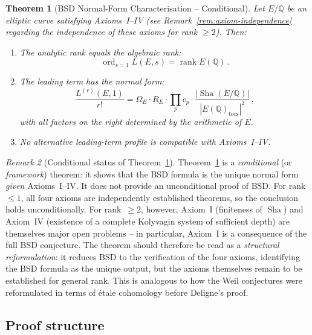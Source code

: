 \documentclass[aps,prd,twocolumn,superscriptaddress,nofootinbib]{revtex4-2}
\newtheorem{theorem}{Theorem}[section]
\theoremstyle{definition}
\theoremstyle{remark}
\newtheorem{remark}[theorem]{Remark}
\DeclareMathOperator{\ord}{ord}
\DeclareMathOperator{\rank}{rank}
\DeclareMathOperator{\Sha}{Sha}
\begin{document}
\begin{theorem}[BSD Normal-Form Characterisation -- Conditional]
\label{thm:bsd_normal}
Let $E/\mathbb{Q}$ be an elliptic curve satisfying Axioms~I--IV (see Remark~\ref{rem:axiom-independence} regarding the independence of these axioms for rank $\geq 2$). Then:
\begin{enumerate}
\item The analytic rank equals the algebraic rank:
\begin{equation}
\ord_{s=1} L(E,s) = \rank E(\mathbb{Q})\,.
\end{equation}
\item The leading term has the normal form:
\begin{equation}
\frac{L^{(r)}(E,1)}{r!} = \Omega_E \cdot R_E \cdot \prod_p c_p \cdot \frac{|\Sha(E/\mathbb{Q})|}{|E(\mathbb{Q})_{\mathrm{tors}}|^2}\,,
\end{equation}
with all factors on the right determined by the arithmetic of $E$.
\item No alternative leading-term profile is compatible with Axioms~I--IV.
\end{enumerate}
\end{theorem}

\begin{remark}[Conditional status of Theorem~\ref{thm:bsd_normal}]
\label{rem:conditional_status}
Theorem~\ref{thm:bsd_normal} is a \textit{conditional} (or \textit{framework}) theorem: it shows that the BSD formula is the unique normal form \textit{given} Axioms~I--IV. It does not provide an unconditional proof of BSD. For rank~$\leq 1$, all four axioms are independently established theorems, so the conclusion holds unconditionally. For rank~$\geq 2$, however, Axiom~I (finiteness of $\Sha$) and Axiom~IV (existence of a complete Kolyvagin system of sufficient depth) are themselves major open problems -- in particular, Axiom~I is a consequence of the full BSD conjecture. The theorem should therefore be read as a \textit{structural reformulation}: it reduces BSD to the verification of the four axioms, identifying the BSD formula as the unique output, but the axioms themselves remain to be established for general rank. This is analogous to how the Weil conjectures were reformulated in terms of \'etale cohomology before Deligne's proof.
\end{remark}

\subsection{Proof structure}
\end{document}
